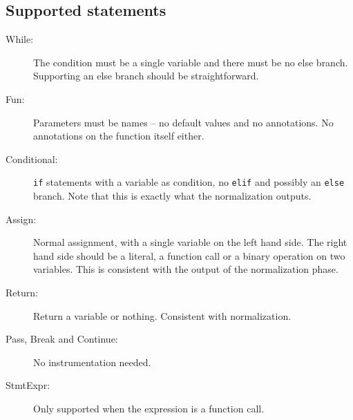\documentclass[11pt]{report}
\begin{document}
\subsection{Supported statements}
\begin{description}
  \item[While:] The condition must be a single variable and there must
    be no else branch. Supporting an else branch should be
    straightforward.
  \item[Fun:] Parameters must be names -- no default values and no
    annotations. No annotations on the function itself either.
  \item[Conditional:] \verb|if| statements with a variable as
    condition, no \verb|elif| and possibly an \verb|else| branch. Note
    that this is exactly what the normalization outputs.
  \item[Assign:] Normal assignment, with a single variable on the left
    hand side. The right hand side should be a literal, a function
    call or a binary operation on two variables. This is consistent
    with the output of the normalization phase.
  \item[Return:] Return a variable or nothing. Consistent with
    normalization.
  \item[Pass, Break and Continue:] No instrumentation needed.
  \item[StmtExpr:] Only supported when the expression is a function
    call.
\end{description}
\end{document}
